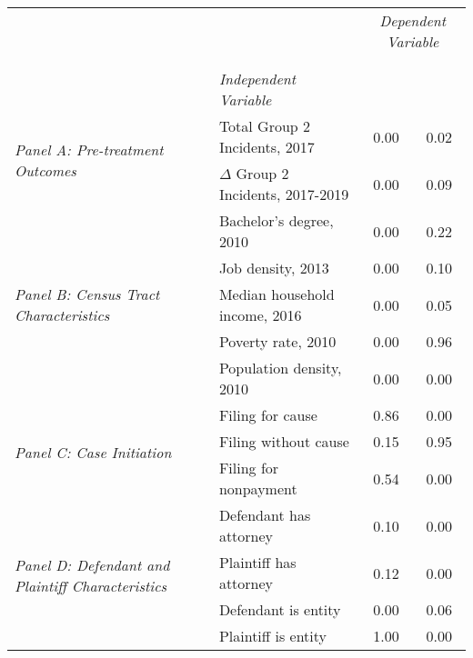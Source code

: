 \begin{tabular}{llcc}
\toprule
 &  & \multicolumn{2}{c}{\textit{Dependent Variable}} \\
\cline{3-4}
\\
 &  &  &  \\
 & \emph{Independent Variable} &  &  \\
\midrule
\multirow[c]{2}{3cm}{\textit{Panel A: Pre-treatment Outcomes}} & Total Group 2 Incidents, 2017 & 0.00 & 0.02 \\
 & $\Delta$ Group 2 Incidents, 2017-2019 & 0.00 & 0.09 \\
\cline{1-4}
\multirow[c]{5}{3cm}{\textit{Panel B: Census Tract Characteristics}} & Bachelor's degree, 2010 & 0.00 & 0.22 \\
 & Job density, 2013 & 0.00 & 0.10 \\
 & Median household income, 2016 & 0.00 & 0.05 \\
 & Poverty rate, 2010 & 0.00 & 0.96 \\
 & Population density, 2010 & 0.00 & 0.00 \\
\cline{1-4}
\multirow[c]{3}{3cm}{\textit{Panel C: Case Initiation}} & Filing for cause & 0.86 & 0.00 \\
 & Filing without cause & 0.15 & 0.95 \\
 & Filing for nonpayment & 0.54 & 0.00 \\
\cline{1-4}
\multirow[c]{4}{3cm}{\textit{Panel D: Defendant and Plaintiff Characteristics}} & Defendant has attorney & 0.10 & 0.00 \\
 & Plaintiff has attorney & 0.12 & 0.00 \\
 & Defendant is entity & 0.00 & 0.06 \\
 & Plaintiff is entity & 1.00 & 0.00 \\
\cline{1-4}
\bottomrule
\end{tabular}
